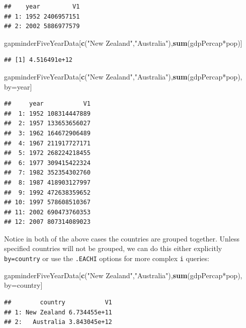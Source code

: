 \documentclass[]{article}
\newenvironment{Shaded}{\begin{snugshade}}{\end{snugshade}}
\newcommand{\KeywordTok}[1]{\textcolor[rgb]{0.13,0.29,0.53}{\textbf{{#1}}}}
\newcommand{\StringTok}[1]{\textcolor[rgb]{0.31,0.60,0.02}{{#1}}}
\newcommand{\NormalTok}[1]{{#1}}
\begin{document}
\begin{verbatim}
##    year         V1
## 1: 1952 2406957151
## 2: 2002 5886977579
\end{verbatim}

\begin{Shaded}
\begin{Highlighting}[]
\NormalTok{gapminderFiveYearData[}\KeywordTok{c}\NormalTok{(}\StringTok{"New Zealand"}\NormalTok{,}\StringTok{"Australia"}\NormalTok{),}\KeywordTok{sum}\NormalTok{(gdpPercap*pop)]}
\end{Highlighting}
\end{Shaded}

\begin{verbatim}
## [1] 4.516491e+12
\end{verbatim}

\begin{Shaded}
\begin{Highlighting}[]
\NormalTok{gapminderFiveYearData[}\KeywordTok{c}\NormalTok{(}\StringTok{"New Zealand"}\NormalTok{,}\StringTok{"Australia"}\NormalTok{),}\KeywordTok{sum}\NormalTok{(gdpPercap*pop), by=year]}
\end{Highlighting}
\end{Shaded}

\begin{verbatim}
##     year           V1
##  1: 1952 108314447889
##  2: 1957 133653656027
##  3: 1962 164672906489
##  4: 1967 211917727171
##  5: 1972 268224218455
##  6: 1977 309415422324
##  7: 1982 352354302760
##  8: 1987 418903127997
##  9: 1992 472638359652
## 10: 1997 578608510367
## 11: 2002 690473760353
## 12: 2007 807314089023
\end{verbatim}

Notice in both of the above cases the countries are grouped together.
Unless specified countries will not be grouped, we can do this either
explicitly \texttt{by=country} or use the \texttt{.EACHI} options for
more complex \texttt{i} queries:

\begin{Shaded}
\begin{Highlighting}[]
\NormalTok{gapminderFiveYearData[}\KeywordTok{c}\NormalTok{(}\StringTok{"New Zealand"}\NormalTok{,}\StringTok{"Australia"}\NormalTok{),}\KeywordTok{sum}\NormalTok{(gdpPercap*pop), by=country]}
\end{Highlighting}
\end{Shaded}

\begin{verbatim}
##        country           V1
## 1: New Zealand 6.734455e+11
## 2:   Australia 3.843045e+12
\end{verbatim}
\end{document}
